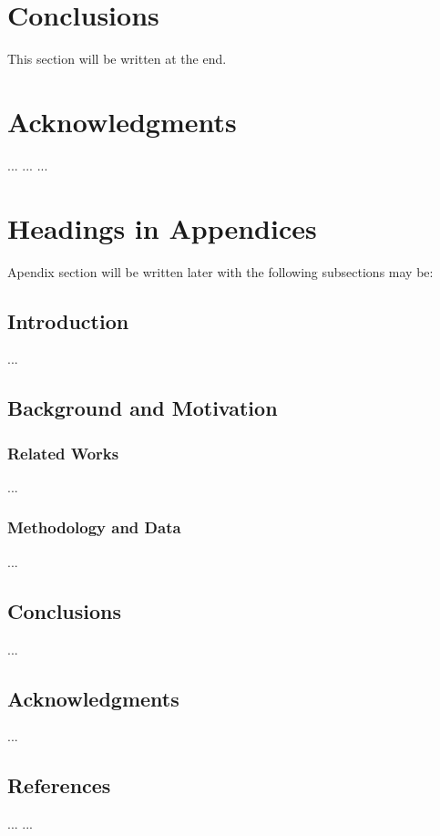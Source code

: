 \documentclass{acm_proc_article-sp}
\begin{document}
\section{Conclusions}
This section will be written at the end.

\section{Acknowledgments}
... ... ...

 
\appendix
\section{Headings in Appendices}
Apendix section will be written later with the following subsections may be:
\subsection{Introduction}
...
\subsection{Background and Motivation}
\subsubsection{Related Works}
...
\subsubsection{Methodology and Data}
...
\subsection{Conclusions}
...
\subsection{Acknowledgments}
...

\subsection{References}
... ...

\balancecolumns
\end{document}
